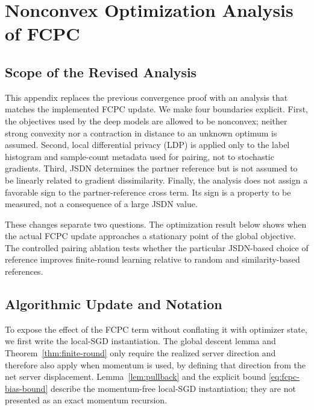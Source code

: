 \documentclass[journal,twoside,web]{ieeecolor}
\begin{document}
\onecolumn
\appendices

\section{Nonconvex Optimization Analysis of FCPC}

\subsection{Scope of the Revised Analysis}

This appendix replaces the previous convergence proof with an analysis that
matches the implemented FCPC update. We make four boundaries explicit.
First, the objectives used by the deep models are allowed to be nonconvex;
neither strong convexity nor a contraction in distance to an unknown optimum
is assumed. Second, local differential privacy (LDP) is applied only to the
label histogram and sample-count metadata used for pairing, not to stochastic
gradients. Third, JSDN determines the partner reference but is not assumed to
be linearly related to gradient dissimilarity. Finally, the analysis does not
assign a favorable sign to the partner-reference cross term. Its sign is a
property to be measured, not a consequence of a large JSDN value.

These changes separate two questions. The optimization result below shows
when the actual FCPC update approaches a stationary point of the global
objective. The controlled pairing ablation tests whether the particular
JSDN-based choice of reference improves finite-round learning relative to
random and similarity-based references.

\subsection{Algorithmic Update and Notation}

To expose the effect of the FCPC term without conflating it with optimizer
state, we first write the local-SGD instantiation. The global descent lemma and
Theorem~\ref{thm:finite-round} only require the realized server direction and
therefore also apply when momentum is used, by defining that direction from
the net server displacement. Lemma~\ref{lem:pullback} and the explicit bound
\eqref{eq:fcpc-bias-bound} describe the momentum-free local-SGD
instantiation; they are not presented as an exact momentum recursion.
\end{document}
